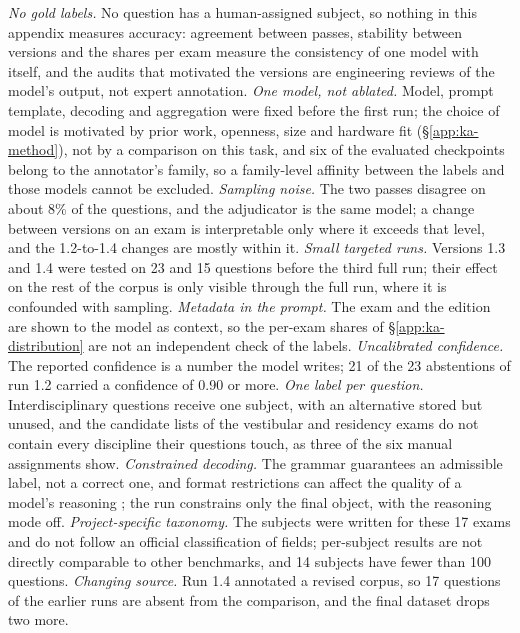 \emph{No gold labels.} No question has a human-assigned subject, so nothing in
this appendix measures accuracy: agreement between passes, stability between
versions and the shares per exam measure the consistency of one model with
itself, and the audits that motivated the versions are engineering reviews of
the model's output, not expert annotation.
\emph{One model, not ablated.} Model, prompt template, decoding and
aggregation were fixed before the first run; the choice of model is motivated
by prior work, openness, size and hardware fit (\S\ref{app:ka-method}), not
by a comparison on this task, and six of the evaluated checkpoints belong to
the annotator's family, so a family-level affinity between the labels and
those models cannot be excluded.
\emph{Sampling noise.} The two passes disagree on about 8\% of the questions,
and the adjudicator is the same model; a change between versions on an exam is
interpretable only where it exceeds that level, and the 1.2-to-1.4 changes
are mostly within it.
\emph{Small targeted runs.} Versions 1.3 and 1.4 were tested on 23 and 15
questions before the third full run; their effect on the rest of the corpus
is only visible through the full run, where it is confounded with sampling.
\emph{Metadata in the prompt.} The exam and the edition are shown to the
model as context, so the per-exam shares of \S\ref{app:ka-distribution} are
not an independent check of the labels.
\emph{Uncalibrated confidence.} The reported confidence is a number the model
writes; 21 of the 23 abstentions of run 1.2 carried a confidence of 0.90 or
more.
\emph{One label per question.} Interdisciplinary questions receive one
subject, with an alternative stored but unused, and the candidate lists of the
vestibular and residency exams do not contain every discipline their
questions touch, as three of the six manual assignments show.
\emph{Constrained decoding.} The grammar guarantees an admissible label, not a
correct one, and format restrictions can affect the quality of a model's
reasoning \citep{tam2024letme}; the run constrains only the final object,
with the reasoning mode off.
\emph{Project-specific taxonomy.} The subjects were written for these 17
exams and do not follow an official classification of fields; per-subject
results are not directly comparable to other benchmarks, and 14 subjects have
fewer than 100 questions.
\emph{Changing source.} Run 1.4 annotated a revised corpus, so 17 questions of
the earlier runs are absent from the comparison, and the final dataset drops
two more.
